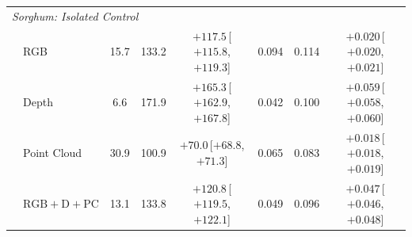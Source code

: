 \documentclass[10pt,twocolumn,letterpaper]{article}
\begin{document}
\begin{table}[t]
\begin{tabular}{l l ccc ccc}
    \midrule
    \multicolumn{8}{l}{\emph{Sorghum: Isolated Control}} \\
    & RGB & 15.7 & 133.2 & $+117.5$\,{\tiny[$+115.8$, $+119.3$]} & 0.094 & 0.114 & $+0.020$\,{\tiny[$+0.020$, $+0.021$]} \\
    & Depth & 6.6 & 171.9 & $+165.3$\,{\tiny[$+162.9$, $+167.8$]} & 0.042 & 0.100 & $+0.059$\,{\tiny[$+0.058$, $+0.060$]} \\
    & Point Cloud & 30.9 & 100.9 & $+70.0$\,{\tiny[$+68.8$, $+71.3$]} & 0.065 & 0.083 & $+0.018$\,{\tiny[$+0.018$, $+0.019$]} \\
    & $\mathrm{RGB}+\mathrm{D}+\mathrm{PC}$ & 13.1 & 133.8 & $+120.8$\,{\tiny[$+119.5$, $+122.1$]} & 0.049 & 0.096 & $+0.047$\,{\tiny[$+0.046$, $+0.048$]} \\
    \bottomrule
  \end{tabular}
\end{table}
\end{document}
